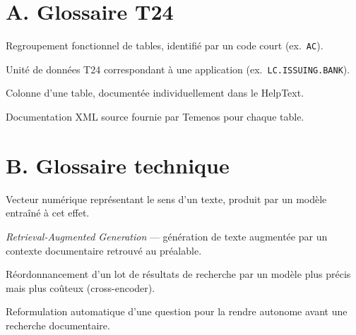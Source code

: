 ﻿\documentclass[12pt,a4paper]{report}
\newcommand{\code}[1]{\texttt{\color{biatbluedk}#1}}
\begin{document}
\section*{A. Glossaire T24}
\begin{description}[leftmargin=3.4cm, style=nextline]
  \item[Module] Regroupement fonctionnel de tables, identifié par un code court (ex.\ \code{AC}).
  \item[Table (fichier T24)] Unité de données T24 correspondant à une application (ex.\ \code{LC.ISSUING.BANK}).
  \item[Champ] Colonne d'une table, documentée individuellement dans le HelpText.
  \item[HelpText] Documentation XML source fournie par Temenos pour chaque table.
\end{description}

\section*{B. Glossaire technique}
\begin{description}[leftmargin=3.4cm, style=nextline]
  \item[Embedding] Vecteur numérique représentant le sens d'un texte, produit par un modèle entraîné à cet effet.
  \item[RAG] \emph{Retrieval-Augmented Generation} --- génération de texte augmentée par un contexte documentaire retrouvé au préalable.
  \item[Reranking] Réordonnancement d'un lot de résultats de recherche par un modèle plus précis mais plus coûteux (cross-encoder).
  \item[Query rewriting] Reformulation automatique d'une question pour la rendre autonome avant une recherche documentaire.
\end{description}
\end{document}
